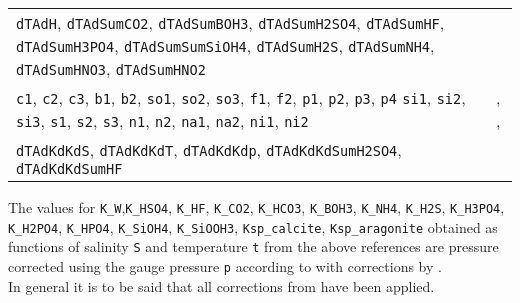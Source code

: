 \documentclass[article,nojss]{jss}
\begin{document}
\begin{footnotesize}
\begin{longtable}{p{}|p{}}
\texttt{dTAdH},  \texttt{dTAdSumCO2}, \texttt{dTAdSumBOH3}, \texttt{dTAdSumH2SO4}, \texttt{dTAdSumHF},  \texttt{dTAdSumH3PO4}, \texttt{dTAdSumSumSiOH4}, \texttt{dTAdSumH2S}, \texttt{dTAdSumNH4}, \texttt{dTAdSumHNO3},  \texttt{dTAdSumHNO2}   & \citet{Hofmann2008}\\
\texttt{c1}, \texttt{c2}, \texttt{c3},  \texttt{b1}, \texttt{b2}, \texttt{so1}, \texttt{so2}, \texttt{so3}, \texttt{f1}, \texttt{f2}, \texttt{p1}, \texttt{p2}, \texttt{p3}, \texttt{p4} 
\texttt{si1}, \texttt{si2}, \texttt{si3}, \texttt{s1}, \texttt{s2}, \texttt{s3}, \texttt{n1}, \texttt{n2}, \texttt{na1}, \texttt{na2}, \texttt{ni1}, \texttt{ni2}
  & \citet{Skoog1982}, \citet{Stumm1996}, \citet{Hofmann2008c}\\
\texttt{dTAdKdKdS}, \texttt{dTAdKdKdT}, \texttt{dTAdKdKdp}, \texttt{dTAdKdKdSumH2SO4}, \texttt{dTAdKdKdSumHF}
& \citet{Hofmann2009}\\ \hline
\end{longtable}
\end{footnotesize}
\noindent
The values for \texttt{K\_W},\texttt{K\_HSO4}, \texttt{K\_HF}, \texttt{K\_CO2}, \texttt{K\_HCO3}, \texttt{K\_BOH3},  \texttt{K\_NH4},  \texttt{K\_H2S},  \texttt{K\_H3PO4}, \texttt{K\_H2PO4}, \texttt{K\_HPO4}, \texttt{K\_SiOH4}, \texttt{K\_SiOOH3},  \texttt{Ksp\_calcite}, \texttt{Ksp\_aragonite} obtained as functions of 
salinity \texttt{S} and temperature \texttt{t} from the above references are pressure corrected using the gauge pressure \texttt{p} according to \citet{Millero1995} 
with corrections by \citet{Lewis1998}.\\

\noindent
In general it is to be said that all corrections from \cite{Lewis1998} have been applied.



\end{document}
